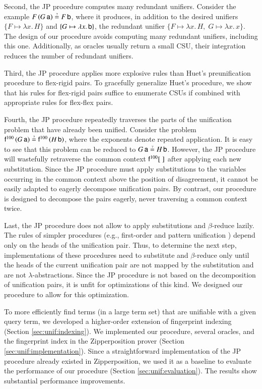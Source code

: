 Second, the JP procedure computes many redundant unifiers. Consider the
example $F \, (G \, \cst{a}) \unif F \, \cst{b}$, where it produces, in addition
to the desired unifiers $\{F \mapsto \lambda x. \, H\}$ and $\{G \mapsto \lambda
x. \, \mathsf{b}\}$, the redundant unifier $\{F \mapsto \lambda x. \, H,\; G \mapsto
\lambda x. \, x\}$. 
The design of our procedure avoids computing many redundant unifiers, including
this one. Additionally, as oracles usually return a small CSU, 
their integration reduces the number of redundant unifiers.

\newpage
Third, the JP procedure applies more explosive rules than Huet's preunification procedure to
flex-rigid pairs. To gracefully generalize Huet's procedure, 
we show that his rules for flex-rigid pairs suffice 
to enumerate CSUs
if combined with appropriate rules for flex-flex pairs.

Fourth, the JP procedure repeatedly traverses the parts of the unification
problem that have already been unified. Consider the problem $\cst{f}^{100} \,
(G \, \cst{a}) \unif \cst{f}^{100} \, (H \, \cst{b})$, where the exponents
denote repeated application. It is easy to see that this problem can be reduced
to $G \, \cst{a} \unif H \, \cst{b}$. However, the JP procedure will wastefully
retraverse the common context $ \mathsf{f}^{100} [\;] $ after applying each new
substitution. Since the JP procedure must apply substitutions to the variables occurring in the
common context above the position of disagreement, it cannot be easily adapted to
eagerly decompose unification pairs. By contrast, our procedure is designed to decompose
the pairs eagerly, never traversing a common context twice.

Last, the JP procedure does not allow to apply substitutions and
$\beta$-reduce lazily.
The rules of simpler procedures (e.g., first-order
\cite{hv-09-unifalgs} and pattern unification \cite{tn-93-patterns}) depend only on
the heads of the unification pair.
Thus, to
determine the next step, implementations of these procedures need to
substitute and
$\beta$-reduce only until the heads of the current unification
pair are not mapped by the substitution and are not $\lambda$-abstractions. 
Since the JP procedure is not based on the decomposition of unification pairs, 
it is unfit for
optimizations of this kind.
We designed our procedure to allow for this optimization.

To more efficiently find terms (in a large term set) that are unifiable with a given query term,
we developed a higher-order extension of fingerprint indexing \cite{ss-12-fp-indexing}
(Section \ref{sec:unif:indexing}).
We implemented our procedure, several oracles,
and the fingerprint index in
the Zipperposition prover (Section \ref{sec:unif:implementation}). Since a
straightforward implementation of the JP procedure already existed in
Zipperposition, we used it as a baseline to evaluate the performance of our
procedure (Section \ref{sec:unif:evaluation}). The results show substantial
performance improvements.


